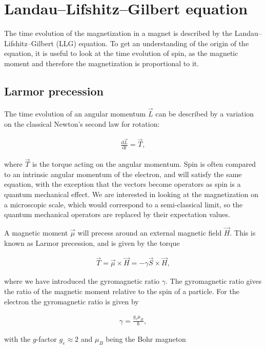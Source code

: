 \documentclass[1p]{elsarticle}		%
\begin{document}
\section{Landau--Lifshitz--Gilbert equation}
The time evolution of the magnetization in a magnet is described by the Landau--Lifshitz--Gilbert (LLG) equation. To get an understanding of the origin of the equation, it is useful to look at the time evolution of spin, as the magnetic moment and therefore the magnetization is proportional to it. 

\subsection{Larmor precession}
The time evolution of an angular momentum $\vec{L}$ can be described by a variation on the classical Newton's second law for rotation:

\begin{align}
\label{eq:newton2rotation}
\frac{\textrm{d} \vec{L}}{\textrm{d} t} = \vec{T},
\end{align}

where $\vec{T}$ is the torque acting on the angular momentum. Spin is often compared to an intrinsic angular momentum of the electron, and will satisfy the same equation, with the exception that the vectors become operators as spin is a quantum mechanical effect. We are interested in looking at the magnetization on a microscopic scale, which would correspond to a semi-classical limit, so the quantum mechanical operators are replaced by their expectation values. 

A magnetic moment $\vec{\mu}$ will precess around an external magnetic field $\vec{H}$. This is known as Larmor precession, and is given by the torque

\begin{align}
\label{eq:larmortorque}
\vec{T} = \vec{\mu} \times \vec{H} = -\gamma \vec{S} \times \vec{H},
\end{align}

where we have introduced the gyromagnetic ratio $\gamma$. The gyromagnetic ratio gives the ratio of the magnetic moment relative to the spin of a particle. For the electron the gyromagnetic ratio is given by

\begin{align}
\gamma = \frac{g_e\mu_B}{\hbar},
\end{align}

with the $g$-factor $g_e \approx 2$ and $\mu_B$ being the Bohr magneton
\end{document}

